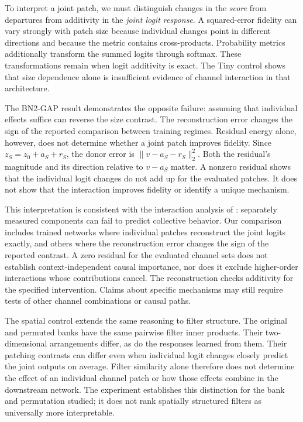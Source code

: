 \documentclass[pdflatex,sn-basic]{sn-jnl}
\begin{document}
To interpret a joint patch, we must distinguish changes in the \emph{score} from departures from additivity in the \emph{joint logit response}. A squared-error fidelity can vary strongly with patch size because individual changes point in different directions and because the metric contains cross-products. Probability metrics additionally transform the summed logits through softmax. These transformations remain when logit additivity is exact. The Tiny control shows that size dependence alone is insufficient evidence of channel interaction in that architecture.

The BN2-GAP result demonstrates the opposite failure: assuming that individual effects suffice can reverse the size contrast. The reconstruction error changes the sign of the reported comparison between training regimes. Residual energy alone, however, does not determine whether a joint patch improves fidelity. Since $z_S=z_0+a_S+r_S$, the donor error is $\lVert v-a_S-r_S\rVert_2^2$. Both the residual's magnitude and its direction relative to $v-a_S$ matter. A nonzero residual shows that the individual logit changes do not add up for the evaluated patches. It does not show that the interaction improves fidelity or identify a unique mechanism.

This interpretation is consistent with the interaction analysis of \citet{vaidyanathan_2026_multiple-mediators}: separately measured components can fail to predict collective behavior. Our comparison includes trained networks where individual patches reconstruct the joint logits exactly, and others where the reconstruction error changes the sign of the reported contrast. A zero residual for the evaluated channel sets does not establish context-independent causal importance, nor does it exclude higher-order interactions whose contributions cancel. The reconstruction checks additivity for the specified intervention. Claims about specific mechanisms may still require tests of other channel combinations or causal paths.

The spatial control extends the same reasoning to filter structure. The original and permuted banks have the same pairwise filter inner products. Their two-dimensional arrangements differ, as do the responses learned from them. Their patching contrasts can differ even when individual logit changes closely predict the joint outputs on average. Filter similarity alone therefore does not determine the effect of an individual channel patch or how those effects combine in the downstream network. The experiment establishes this distinction for the bank and permutation studied; it does not rank spatially structured filters as universally more interpretable.
\end{document}
